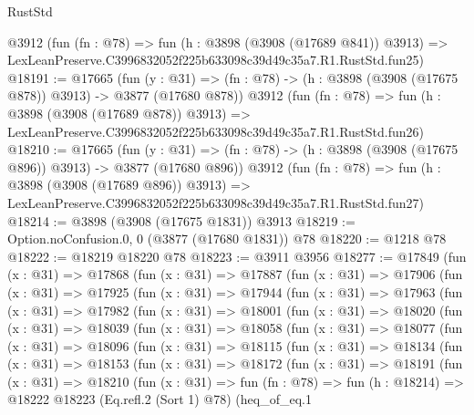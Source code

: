 \begin{lexlean}{RustStd}
\begin{coremodule}
    @3912
    (fun (fn : @78) =>
    fun (h : @3898 (@3908 (@17689 @841)) @3913) =>
    LexLeanPreserve.C3996832052f225b633098c39d49c35a7.R1.RustStd.fun25)
@18191 := @17665
    (fun (y : @31) => (fn : @78) -> (h : @3898 (@3908 (@17675 @878)) @3913) -> @3877 (@17680 @878))
    @3912
    (fun (fn : @78) =>
    fun (h : @3898 (@3908 (@17689 @878)) @3913) =>
    LexLeanPreserve.C3996832052f225b633098c39d49c35a7.R1.RustStd.fun26)
@18210 := @17665
    (fun (y : @31) => (fn : @78) -> (h : @3898 (@3908 (@17675 @896)) @3913) -> @3877 (@17680 @896))
    @3912
    (fun (fn : @78) =>
    fun (h : @3898 (@3908 (@17689 @896)) @3913) =>
    LexLeanPreserve.C3996832052f225b633098c39d49c35a7.R1.RustStd.fun27)
@18214 := @3898 (@3908 (@17675 @1831)) @3913
@18219 := Option.noConfusion.{0, 0} (@3877 (@17680 @1831)) @78
@18220 := @1218 @78
@18222 := @18219 @18220 @78
@18223 := @3911 @3956
@18277 := @17849
    (fun (x : @31) =>
    @17868
      (fun (x : @31) =>
      @17887
        (fun (x : @31) =>
        @17906
          (fun (x : @31) =>
          @17925
            (fun (x : @31) =>
            @17944
              (fun (x : @31) =>
              @17963
                (fun (x : @31) =>
                @17982
                  (fun (x : @31) =>
                  @18001
                    (fun (x : @31) =>
                    @18020
                      (fun (x : @31) =>
                      @18039
                        (fun (x : @31) =>
                        @18058
                          (fun (x : @31) =>
                          @18077
                            (fun (x : @31) =>
                            @18096
                              (fun (x : @31) =>
                              @18115
                                (fun (x : @31) =>
                                @18134
                                  (fun (x : @31) =>
                                  @18153
                                    (fun (x : @31) =>
                                    @18172
                                      (fun (x : @31) =>
                                      @18191
                                        (fun (x : @31) =>
                                        @18210
                                          (fun (x : @31) =>
                                          fun (fn : @78) =>
                                          fun (h : @18214) =>
                                          @18222
                                            @18223
                                            (Eq.refl.{2} (Sort 1) @78)
                                            (heq_of_eq.{1}

\end{coremodule}
\end{lexlean}
